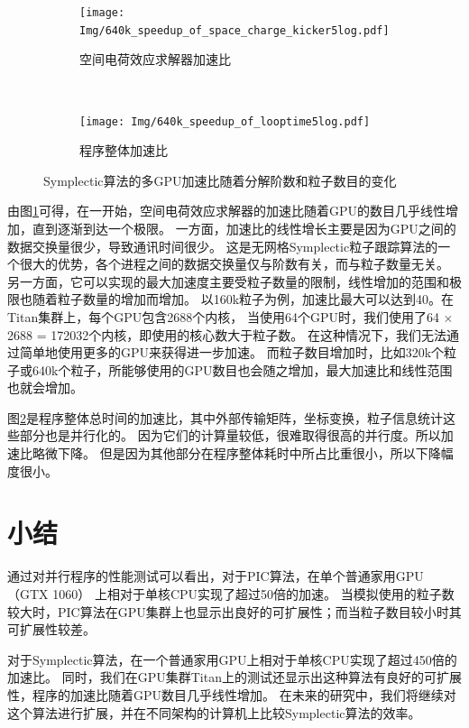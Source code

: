 \begin{figure}[!htb]
    \centering
    \begin{subfigure}[b]{0.9\textwidth}
        \texttt{[image: Img/640k\_speedup\_of\_space\_charge\_kicker5log.pdf]}
        \caption{空间电荷效应求解器加速比}
        \label{fig:SCTitan}
    \end{subfigure}
    \quad
    ~ %
    \begin{subfigure}[b]{0.9\textwidth}
        \texttt{[image: Img/640k\_speedup\_of\_looptime5log.pdf]}
        \caption{程序整体加速比}
        \label{fig:TotalTitan}
    \end{subfigure}
    \caption{Symplectic算法的多GPU加速比随着分解阶数和粒子数目的变化}\label{fig:Titan}
\end{figure}

由图\ref{fig:SCTitan}可得，在一开始，空间电荷效应求解器的加速比随着GPU的数目几乎线性增加，直到逐渐到达一个极限。
一方面，加速比的线性增长主要是因为GPU之间的数据交换量很少，导致通讯时间很少。
这是无网格Symplectic粒子跟踪算法的一个很大的优势，各个进程之间的数据交换量仅与阶数有关，而与粒子数量无关。
另一方面，它可以实现的最大加速度主要受粒子数量的限制，线性增加的范围和极限也随着粒子数量的增加而增加。
以160k粒子为例，加速比最大可以达到40。在Titan集群上，每个GPU包含2688个内核，
当使用64个GPU时，我们使用了64 $\times$ 2688 = 172032个内核，即使用的核心数大于粒子数。
在这种情况下，我们无法通过简单地使用更多的GPU来获得进一步加速。
而粒子数目增加时，比如320k个粒子或640k个粒子，所能够使用的GPU数目也会随之增加，最大加速比和线性范围也就会增加。

图\ref{fig:TotalTitan}是程序整体总时间的加速比，其中外部传输矩阵，坐标变换，粒子信息统计这些部分也是并行化的。
因为它们的计算量较低，很难取得很高的并行度。所以加速比略微下降。
但是因为其他部分在程序整体耗时中所占比重很小，所以下降幅度很小。

\section{小结}                      \label{section:Performance_conclusion}
通过对并行程序的性能测试可以看出，对于PIC算法，在单个普通家用GPU （GTX 1060） 上相对于单核CPU实现了超过50倍的加速。
当模拟使用的粒子数较大时，PIC算法在GPU集群上也显示出良好的可扩展性；而当粒子数目较小时其可扩展性较差。

对于Symplectic算法，在一个普通家用GPU上相对于单核CPU实现了超过450倍的加速比。
同时，我们在GPU集群Titan上的测试还显示出这种算法有良好的可扩展性，程序的加速比随着GPU数目几乎线性增加。
在未来的研究中，我们将继续对这个算法进行扩展，并在不同架构的计算机上比较Symplectic算法的效率。